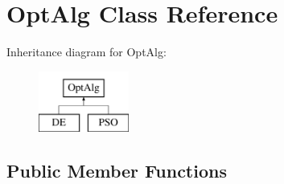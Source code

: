 \hypertarget{classOptAlg}{}\section{Opt\+Alg Class Reference}
\label{classOptAlg}
Inheritance diagram for Opt\+Alg\+:\begin{figure}[H]
\begin{center}
\leavevmode
\includegraphics[height=2.000000cm]{classOptAlg}
\end{center}
\end{figure}
\subsection*{Public Member Functions}
